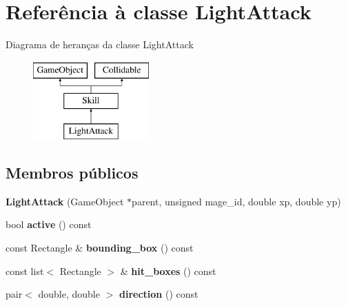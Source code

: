 \hypertarget{classLightAttack}{}\section{Referência à classe Light\+Attack}
\label{classLightAttack}
Diagrama de heranças da classe Light\+Attack\begin{figure}[H]
\begin{center}
\leavevmode
\includegraphics[height=3.000000cm]{classLightAttack}
\end{center}
\end{figure}
\subsection*{Membros públicos}
\begin{DoxyCompactItemize}
\item 
\mbox{\label{classLightAttack_a85172d92441b302e99c4209df40792e6}} 
{\bfseries Light\+Attack} (Game\+Object $\ast$parent, unsigned mage\+\_\+id, double xp, double yp)
\item 
\mbox{\label{classLightAttack_a69d89dd9e2374379fcdf6f464e87707c}} 
bool {\bfseries active} () const
\item 
\mbox{\label{classLightAttack_a9fa4f72585e6666f40ea55d539e40fe4}} 
const Rectangle \& {\bfseries bounding\+\_\+box} () const
\item 
\mbox{\label{classLightAttack_aa547d66653570e9a989aed007f42919b}} 
const list$<$ Rectangle $>$ \& {\bfseries hit\+\_\+boxes} () const
\item 
\mbox{\label{classLightAttack_a45cd647fcbb73023ea7f7d7fde647688}} 
pair$<$ double, double $>$ {\bfseries direction} () const
\end{DoxyCompactItemize}

